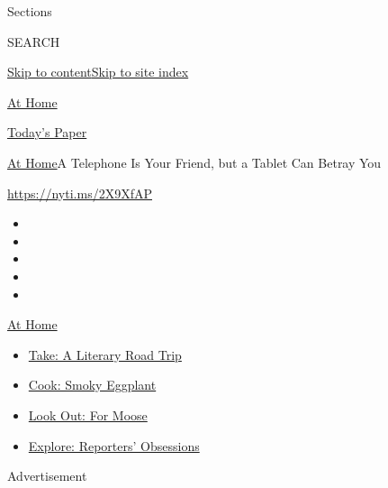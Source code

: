 Sections

SEARCH

\protect\hyperlink{site-content}{Skip to
content}\protect\hyperlink{site-index}{Skip to site index}

\href{https://www.nytimes.com/spotlight/at-home}{At Home}

\href{https://myaccount.nytimes.com/auth/login?response_type=cookie\&client_id=vi}{}

\href{https://www.nytimes.com/section/todayspaper}{Today's Paper}

\href{/spotlight/at-home}{At Home}\textbar{}A Telephone Is Your Friend,
but a Tablet Can Betray You

\url{https://nyti.ms/2X9XfAP}

\begin{itemize}
\item
\item
\item
\item
\item
\end{itemize}

\href{https://www.nytimes.com/spotlight/at-home?action=click\&pgtype=Article\&state=default\&region=TOP_BANNER\&context=at_home_menu}{At
Home}

\begin{itemize}
\tightlist
\item
  \href{https://www.nytimes.com/2020/07/28/books/time-for-a-literary-road-trip.html?action=click\&pgtype=Article\&state=default\&region=TOP_BANNER\&context=at_home_menu}{Take:
  A Literary Road Trip}
\item
  \href{https://www.nytimes.com/2020/07/29/magazine/bored-with-your-home-cooking-some-smoky-eggplant-will-fix-that.html?action=click\&pgtype=Article\&state=default\&region=TOP_BANNER\&context=at_home_menu}{Cook:
  Smoky Eggplant}
\item
  \href{https://www.nytimes.com/2020/07/27/travel/moose-michigan-isle-royale.html?action=click\&pgtype=Article\&state=default\&region=TOP_BANNER\&context=at_home_menu}{Look
  Out: For Moose}
\item
  \href{https://www.nytimes.com/interactive/2020/at-home/even-more-reporters-editors-diaries-lists-recommendations.html?action=click\&pgtype=Article\&state=default\&region=TOP_BANNER\&context=at_home_menu}{Explore:
  Reporters' Obsessions}
\end{itemize}

Advertisement

